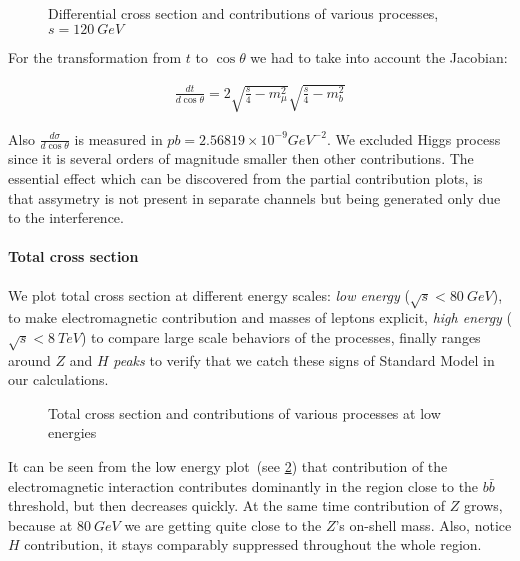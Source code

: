 \documentclass{article}
\begin{document}
\begin{figure}[H]
    \centering
    \hfill%
    \caption{Differential cross section and contributions of various processes, $s = 120~GeV$}%
    \label{fig:dcrsc}
\end{figure}

For the transformation from $t$ to $\cos{\theta}$ we had to take into account the Jacobian:

\begin{align}
    \frac{d t}{d \cos{\theta}} = 2 \sqrt{\frac{s}{4} - m_\mu^2} \sqrt{\frac{s}{4} - m_b^2}
\end{align}

Also $\frac{d \sigma}{d \cos{\theta}}$ is measured in $pb = 2.56819\times10^{-9} GeV^{-2}$. We excluded Higgs process since it is several orders of magnitude smaller then other contributions. The essential effect which can be discovered from the partial contribution plots, is that assymetry is not present in separate channels but being generated only due to the interference.

\paragraph{Total cross section} We plot total cross section at different energy scales: \textit{low energy} ($\sqrt{s}<80~GeV$), to make electromagnetic contribution and masses of leptons explicit, \textit{high energy} ($\sqrt{s}<8~TeV$) to compare large scale behaviors of the processes, finally ranges around $Z$ and $H$ \textit{peaks} to verify that we catch these signs of Standard Model in our calculations.

\begin{figure}[H]
    \centering
    \hfill%
    \caption{Total cross section and contributions of various processes at low energies}%
    \label{fig:totcrsc_lowS}
\end{figure}

It can be seen from the low energy plot~(see \cref{fig:totcrsc_lowS}) that contribution of the electromagnetic interaction contributes dominantly in the region close to the $b \bar{b}$ threshold, but then decreases quickly. At the same time contribution of $Z$ grows, because at $80~GeV$ we are getting quite close to the $Z$'s on-shell mass. Also, notice $H$ contribution, it stays comparably suppressed throughout the whole region.
\end{document}

